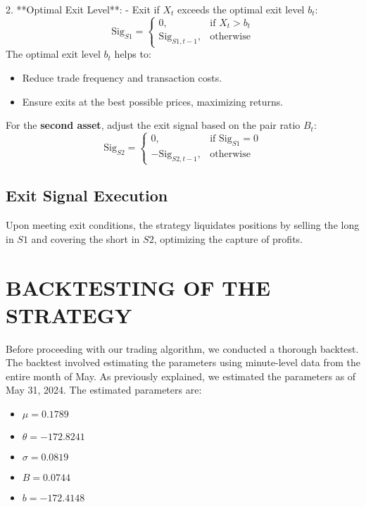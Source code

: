 \documentclass{article}
\begin{document}
2. **Optimal Exit Level**:
    - Exit if \( X_t \) exceeds the optimal exit level \( b_t \):
    \[
    \text{Sig}_{S1} = 
    \begin{cases} 
    0, & \text{if } X_t > b_t \\
    \text{Sig}_{S1, t-1}, & \text{otherwise}
    \end{cases}
    \]
The optimal exit level \( b_t \) helps to:
\begin{itemize}

    \item Reduce trade frequency and transaction costs.
    \item Ensure exits at the best possible prices, maximizing returns.
\end{itemize}\vspace{1em}

For the \textbf{second asset}, adjust the exit signal based on the pair ratio \( B_t \):
\[
\text{Sig}_{S2} = 
\begin{cases} 
0, & \text{if } \text{Sig}_{S1} = 0 \\
-\text{Sig}_{S2, t-1}, & \text{otherwise}
\end{cases}
\]


\subsection*{Exit Signal Execution}

Upon meeting exit conditions, the strategy liquidates positions by selling the long in \( S1 \) and covering the short in \( S2 \), optimizing the capture of profits.

\section{BACKTESTING OF THE STRATEGY}

Before proceeding with our trading algorithm, we conducted a thorough backtest. The backtest involved estimating the parameters using minute-level data from the entire month of May. As previously explained, we estimated the parameters as of May 31, 2024. The estimated parameters are:

\begin{itemize}
    \item \( \mu = 0.1789 \)
    \item \( \theta = -172.8241 \)
    \item \( \sigma = 0.0819 \)
    \item \( B = 0.0744 \)
    \item \( b = -172.4148 \)
\end{itemize}
\end{document}
